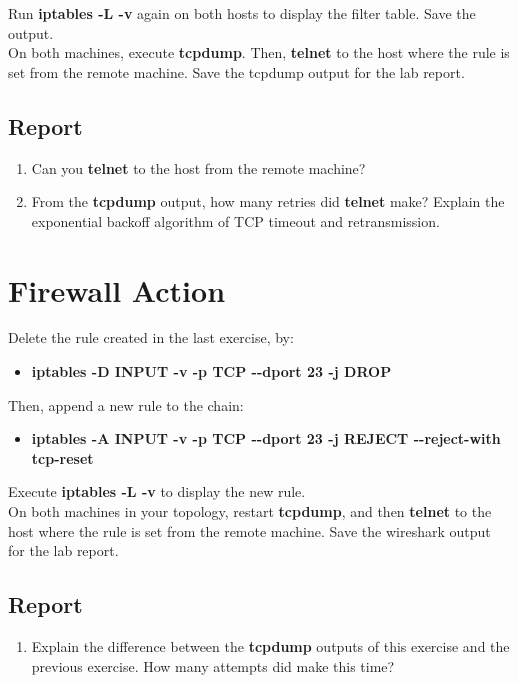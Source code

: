 \documentclass{../UTNetLab}
\begin{document}
	\setlength{\parindent}{0pt}
	Run \textbf{iptables -L -v} again on both hosts to display the filter table. Save the output.\\
	On both machines, execute \textbf{tcpdump}. Then, \textbf{telnet} to the host where the rule is set from the remote machine. Save the tcpdump output for the lab report.

	\subsection*{Report}
	\begin{enumerate}
		\item Can you \textbf{telnet} to the host from the remote machine?
		\item From the \textbf{tcpdump} output, how many retries did \textbf{telnet} make? Explain the exponential backoff algorithm of TCP timeout and retransmission.
	\end{enumerate}
	
\section{Firewall Action}
	Delete the rule created in the last exercise, by:	
	\begin{itemize}
		\item \textbf{iptables -D INPUT -v -p TCP -{}-dport 23 -j DROP}
	\end{itemize}
	
	Then, append a new rule to the  chain:	
	\begin{itemize}
		\item \textbf{iptables -A INPUT -v -p TCP -{}-dport 23 -j REJECT -{}-reject-with tcp-reset} 
	\end{itemize}
	
	Execute \textbf{iptables -L -v} to display the new rule.\\
	On both machines in your topology, restart \textbf{tcpdump}, and then \textbf{telnet} to the host where the rule is set from the remote machine. Save the wireshark output for the lab report.
	
	\subsection*{Report}
	\begin{enumerate}
		\setlength{\itemindent}{0pt}
		\item Explain the difference between the \textbf{tcpdump} outputs of this exercise and the previous exercise. How many attempts did  make this time?
	\end{enumerate}
\end{document}
